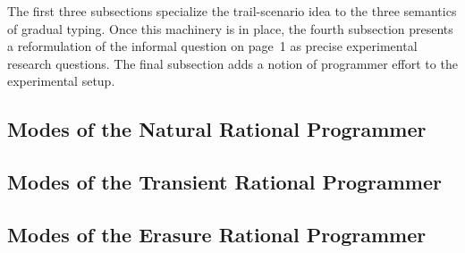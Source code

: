 
The first three subsections specialize the trail-scenario idea to the
three semantics of gradual typing. Once this machinery is in place,
the fourth subsection presents a reformulation of the informal
question on page~1 as precise experimental research questions. The
final subsection adds a notion of programmer effort to the
experimental setup. 

\def\rsub#1#2{\subsection{#2} \label{sub:#1} }

\rsub{natural}   {Modes of the Natural Rational Programmer} 
\rsub{transient} {Modes of the Transient Rational Programmer} 
\rsub{erasure}   {Modes of the Erasure Rational Programmer} 
